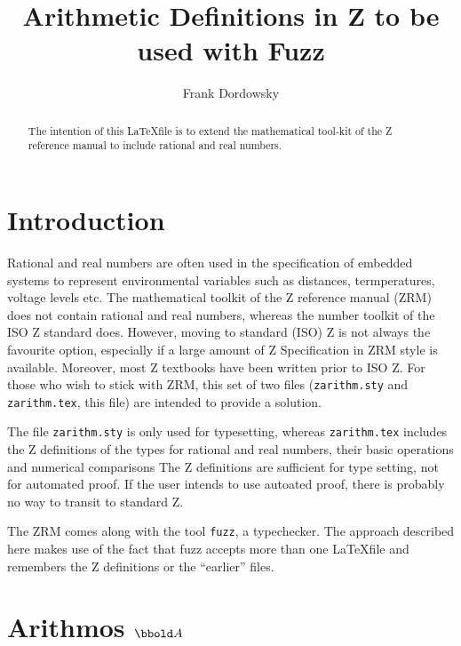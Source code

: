 \documentclass[12pt]{scrartcl}
\begin{document}
\title{Arithmetic Definitions in  Z to be used with Fuzz}

\author{Frank Dordowsky}

\maketitle

\begin{abstract}
The intention of this \LaTeX file is to extend the mathematical
tool-kit of the Z reference manual to include rational and real
numbers. 
\end{abstract}


\section{Introduction}
\label{sec:intro}
Rational and real numbers are often used in the specification of
embedded systems to represent environmental variables such as
distances, termperatures, voltage levels etc. The mathematical toolkit
of the Z reference manual (ZRM) does not contain rational and real
numbers, whereas the number toolkit of the ISO Z standard
does. However, moving to standard (ISO) Z is not always the favourite
option, especially if a large amount of Z Specification in ZRM style
is available. Moreover, most Z textbooks have been written prior to
ISO Z. For those who wish to stick with ZRM, this set of two files
(\texttt{zarithm.sty} and \texttt{zarithm.tex}, this file) are
intended to provide a solution.

The file \texttt{zarithm.sty} is only used for typesetting, whereas
\texttt{zarithm.tex} includes the Z definitions of the types for
rational and real numbers, their basic operations and numerical
comparisons The Z definitions are sufficient for type setting, not for
automated proof. If the user intends to use autoated proof, there is
probably no way to transit to standard Z.

The ZRM comes along with the tool \texttt{fuzz}, a typechecker. The
approach described here makes use of the fact that fuzz accepts more
than one \LaTeX file and remembers the Z definitions or the
``earlier'' files.

\section{Arithmos $\arithmos$}
\label{sec:arithmos}
\end{document}
